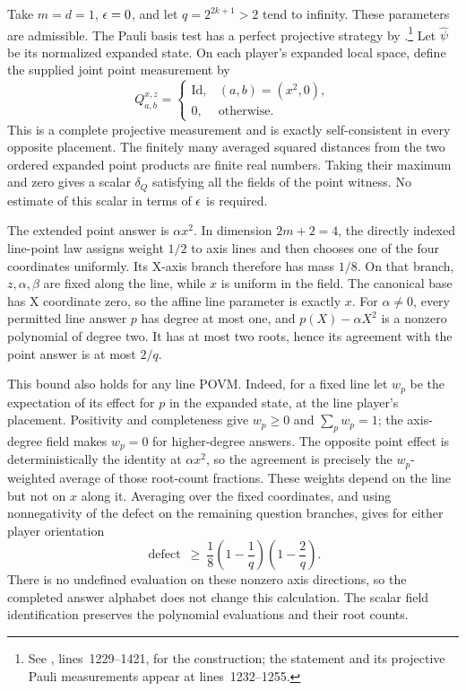 \documentclass[11pt]{article}
\newcommand{\Id}{\mathrm{Id}}
\begin{document}
Take $m=d=1$, $\epsilon=0$, and let $q=2^{2k+1}>2$ tend to infinity.
These parameters are admissible. The Pauli basis test has a perfect projective strategy by
.\footnote{See
,
lines~1229--1421, for the construction; the statement and its projective Pauli
measurements appear at lines~1232--1255.}
Let $\hat\psi$ be its normalized expanded state. On each player's expanded
local space, define the supplied joint point measurement by
\[
 Q^{x,z}_{a,b}=
 \begin{cases}
   \Id,&(a,b)=(x^2,0),\\
   0,&\text{otherwise}.
 \end{cases}
\]
This is a complete projective measurement and is exactly self-consistent in
every opposite placement. The finitely many averaged squared distances from the
two ordered expanded point products are finite real numbers. Taking their
maximum and zero gives a scalar $\delta_Q$ satisfying all the fields of the
point witness. No estimate of this scalar in terms of $\epsilon$ is required.

The extended point answer is $\alpha x^2$. In dimension $2m+2=4$, the directly
indexed line-point law assigns weight $1/2$ to axis lines and then chooses one
of the four coordinates uniformly. Its X-axis branch therefore has mass $1/8$.
On that branch, $z,\alpha,\beta$ are fixed along the line, while $x$ is uniform
in the field. The canonical base has X coordinate zero, so the affine line
parameter is exactly $x$. For $\alpha\ne0$, every permitted line answer $p$
has degree at most one, and $p(X)-\alpha X^2$ is a nonzero polynomial of degree
two. It has at most two roots, hence its agreement with the point answer is at
most $2/q$.

This bound also holds for any line POVM. Indeed, for a fixed line let $w_p$
be the expectation of its effect for $p$ in the expanded state, at the line
player's placement. Positivity and completeness give $w_p\ge0$ and
$\sum_p w_p=1$; the axis-degree field makes $w_p=0$ for higher-degree answers.
The opposite point effect is deterministically the identity at $\alpha x^2$,
so the agreement is precisely the $w_p$-weighted average of those root-count
fractions. These weights depend on the line but not on $x$ along it. Averaging
over the fixed coordinates, and using nonnegativity of the defect on the
remaining question branches, gives for either player orientation
\[
 \operatorname{defect}\ \ge\
 \frac18\left(1-\frac1q\right)\left(1-\frac2q\right).
\]
There is no undefined evaluation on these nonzero axis directions, so the
completed answer alphabet does not change this calculation. The scalar field
identification preserves the polynomial evaluations and their root counts.
\end{document}
